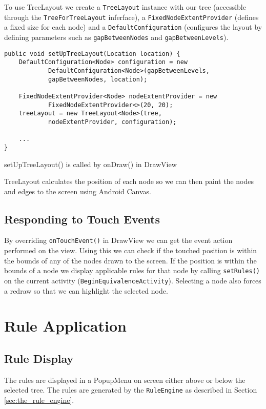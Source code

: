 \documentclass{report}
\begin{document}
To use TreeLayout we create a {\tt TreeLayout} instance with our tree (accessible through the {\tt TreeForTreeLayout} inferface), a {\tt FixedNodeExtentProvider} (defines a fixed size for each node) and a {\tt DefaultConfiguration} (configures the layout by defining parameters such as {\tt gapBetweenNodes} and {\tt gapBetweenLevels}).

\begin{listing}[ht]
\begin{verbatim}
public void setUpTreeLayout(Location location) {
    DefaultConfiguration<Node> configuration = new 
            DefaultConfiguration<Node>(gapBetweenLevels, 
            gapBetweenNodes, location);

    FixedNodeExtentProvider<Node> nodeExtentProvider = new 
            FixedNodeExtentProvider<>(20, 20);
    treeLayout = new TreeLayout<Node>(tree,
            nodeExtentProvider, configuration);

    ...
}
\end{verbatim}
\caption{setUpTreeLayout() is called by onDraw() in DrawView}
\label{setuptreelayout}
\end{listing}

TreeLayout calculates the position of each node so we can then paint the nodes and edges to the screen using Android Canvas.

\subsection{Responding to Touch Events}

By overriding {\tt onTouchEvent()} in DrawView we can get the event action performed on the view. Using this we can check if the touched position is within the bounds of any of the nodes drawn to the screen. If the position is within the bounds of a node we display applicable rules for that node by calling {\tt setRules()} on the current activity ({\tt BeginEquivalenceActivity}). Selecting a node also forces a redraw so that we can highlight the selected node.

\section{Rule Application}

\subsection{Rule Display}

The rules are displayed in a PopupMenu on screen either above or below the selected tree. The rules are generated by the {\tt RuleEngine} as described in Section \ref{sec:the_rule_engine}.
\end{document}

